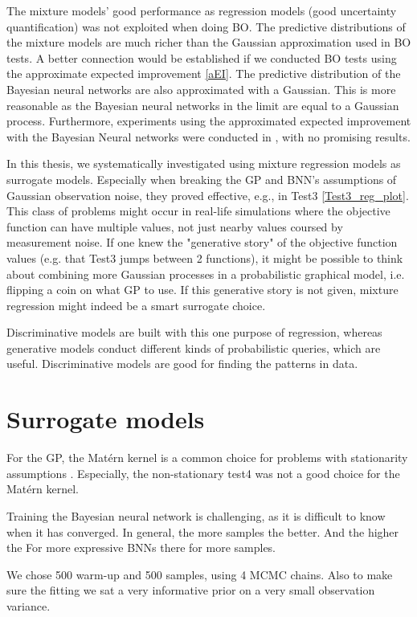 The mixture models' good performance as regression models (good uncertainty quantification) was not
exploited when doing BO. The predictive distributions of the mixture models are much richer than the
Gaussian approximation used in BO tests. A better connection would be established if we conducted BO
tests using the approximate expected improvement \eqref{aEI}. The predictive distribution of the
Bayesian neural networks are also approximated with a Gaussian. This is more reasonable as the
Bayesian neural networks in the limit are equal to a Gaussian process. Furthermore, experiments
using the approximated expected improvement with the Bayesian Neural networks were conducted in
\cite{PhDthesis}, with no promising results. 

In this thesis, we systematically investigated using mixture regression models as surrogate models.
Especially when breaking the GP and BNN's assumptions of Gaussian observation noise, they proved
effective, e.g., in Test3 \ref{Test3_reg_plot}. This class of problems might occur in real-life
simulations where the objective function can have multiple values, not just nearby values coursed by
measurement noise. If one knew the "generative story" of the objective function values (e.g. that
Test3 jumps between 2 functions), it might be possible to think about combining more Gaussian
processes in a probabilistic graphical model, i.e. flipping a coin on what GP to use. If this
generative story is not given, mixture regression might indeed be a smart surrogate choice. 

Discriminative models are built with this one purpose of regression, whereas generative models
conduct different kinds of probabilistic queries, which are useful. Discriminative models are good
for finding the patterns in data.

\section{Surrogate models}
For the GP, the Matérn kernel is a common choice for problems with
stationarity assumptions \cite{TakeHumanOutOfLoop}. Especially, the non-stationary test4 was not a
good choice for the Matérn kernel. 

Training the Bayesian neural network is challenging, as it is difficult to know when it has
converged. In general, the more samples the better. And the higher the For more expressive BNNs
there for more samples. 

We chose 500 warm-up and 500 samples, using 4 MCMC chains.  Also to make
sure the fitting we sat a very informative prior on a very small observation variance. 

